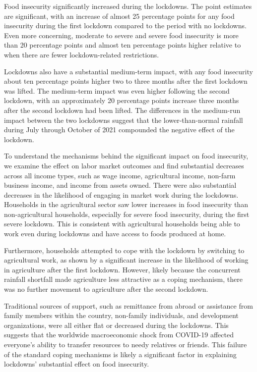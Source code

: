 \documentclass{wber}
\begin{document}
Food insecurity significantly increased during the lockdowns. The point
estimates are significant, with an increase of almost 25 percentage
points for any food insecurity during the first lockdown compared to the
period with no lockdowns. Even more concerning, moderate to severe and
severe food insecurity is more than 20 percentage points and almost ten
percentage points higher relative to when there are fewer
lockdown-related restrictions.

Lockdowns also have a substantial medium-term impact, with any food
insecurity about ten percentage points higher two to three months after
the first lockdown was lifted. The medium-term impact was even higher
following the second lockdown, with an approximately 20 percentage
points increase three months after the second lockdown had been lifted.
The differences in the medium-run impact between the two lockdowns
suggest that the lower-than-normal rainfall during July through October
of 2021 compounded the negative effect of the lockdown.

To understand the mechanisms behind the significant impact on food
insecurity, we examine the effect on labor market outcomes and find
substantial decreases across all income types, such as wage income,
agricultural income, non-farm business income, and income from assets
owned. There were also substantial decreases in the likelihood of
engaging in market work during the lockdowns. Households in the
agricultural sector saw lower increases in food insecurity than
non-agricultural households, especially for severe food insecurity,
during the first severe lockdown. This is consistent with agricultural
households being able to work even during lockdowns and have access to
foods produced at home.

Furthermore, households attempted to cope with the lockdown by switching
to agricultural work, as shown by a significant increase in the
likelihood of working in agriculture after the first lockdown. However,
likely because the concurrent rainfall shortfall made agriculture less
attractive as a coping mechanism, there was no further movement to
agriculture after the second lockdown.

Traditional sources of support, such as remittance from abroad or
assistance from family members within the country, non-family
individuals, and development organizations, were all either flat or
decreased during the lockdowns. This suggests that the worldwide
macroeconomic shock from COVID-19 affected everyone's ability to
transfer resources to needy relatives or friends. This failure of the
standard coping mechanisms is likely a significant factor in explaining
lockdowns' substantial effect on food insecurity.
\end{document}

